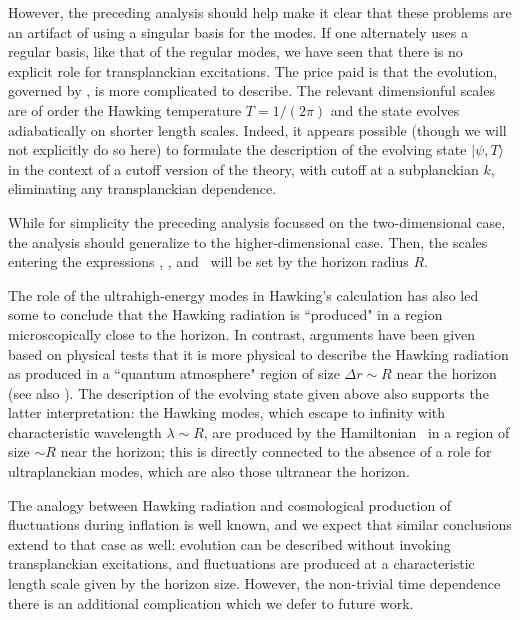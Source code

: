 However, the preceding analysis should help make it clear that these problems are an artifact of using a singular basis for the modes.  If one alternately uses a regular basis, like that of the regular modes, we have seen that there is no explicit role for transplanckian excitations.  The price paid is that the evolution, governed by \hamreg, is more complicated to describe. 
The relevant dimensionful scales are of order the Hawking temperature $T=1/(2\pi)$ and the state evolves adiabatically on shorter length scales.  Indeed, it appears possible (though we will not explicitly do so here) to formulate the description of the evolving state  $|\psi,T\rangle$ in the context of a cutoff version of the theory, with cutoff at a subplanckian $k$, eliminating any transplanckian dependence.  

While for simplicity the preceding analysis focussed on the two-dimensional case, the analysis should generalize to the higher-dimensional case.  Then, the scales entering the expressions \hamreg, \ABdefs, and \Bstraight\ will be set by the horizon radius $R$.  

The role of the ultrahigh-energy modes in Hawking's calculation has also led some to conclude that the Hawking radiation is ``produced" in a region microscopically close to the horizon.  In contrast, arguments have been given based on physical tests that it is more physical to describe the Hawking radiation as produced in a ``quantum atmosphere" region of size $\Delta r\sim R$ near the horizon (see also ).  The description of the evolving state given above also supports the latter interpretation:  the Hawking modes, which escape to infinity with characteristic wavelength $\lambda\sim R$, are produced by the Hamiltonian \hamreg\ in a region of size $\sim R$ near the horizon; this is directly connected to the absence of a role for ultraplanckian modes, which are also those ultranear the horizon.

The analogy between Hawking radiation and cosmological production of fluctuations during inflation is well known, and we expect that similar conclusions extend to that case as well: evolution can be described without invoking transplanckian excitations, and fluctuations are produced at a characteristic length scale given by the horizon size.  However, the non-trivial time dependence there is an additional complication which we defer to future work.

